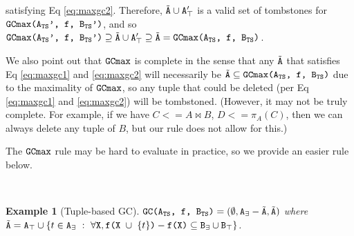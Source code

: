 \documentclass[10pt]{proc}
\numberwithin{equation}{section}
\newtheorem{example}{Example}[section]
\renewcommand{\tt}[1]{\ifmmode\text{\texttt{#1}}\else\texttt{#1}\fi}
\begin{document}
satisfying Eq \eqref{eq:maxgc2}.
Therefore, $\tilde{\tt{A}} \cup \tt{A}_\top'$ is a valid set of tombstones for $\tt{GCmax(A$_\text{TS}$', f, B$_\text{TS}$')}$, and so $\tt{GCmax(A$_\text{TS}$', f, B$_\text{TS}$')} \supseteq \tilde{\tt{A}} \cup \tt{A}_\top' \supseteq \tilde{\tt{A}} = \tt{GCmax(A$_\text{TS}$, f, B$_\text{TS}$)}$.

We also point out that $\tt{GCmax}$ is complete in the sense that any $\tilde{\tt{A}}$ that satisfies Eq \eqref{eq:maxgc1} and \eqref{eq:maxgc2} will necessarily be $\tilde{\tt{A}} \subseteq \tt{GCmax(A$_\text{TS}$, f, B$_\text{TS}$)}$ due to the maximality of $\tt{GCmax}$, so any tuple that could be deleted (per Eq \eqref{eq:maxgc1} and \eqref{eq:maxgc2}) will be tombstoned.
(However, it may not be truly complete. For example, if we have $C <= A \Join B$, $D <= \pi_A(C)$, then we can always delete any tuple of $B$, but our rule does not allow for this.)

The $\tt{GCmax}$ rule may be hard to evaluate in practice, so we provide an easier rule below.

~

\begin{example}[Tuple-based GC]
$\tt{GC(A$_\text{TS}$, f, B$_\text{TS}$)} = (\emptyset, \tt{A}_\exists - \tilde{\tt{A}}, \tilde{\tt{A}})$ where $\tilde{\tt{A}} = \tt{A}_\top \cup \{t \in \tt{A}_\exists ~:~ \forall \tt{X}, \tt{f(X $\cup$ $\{t\}$)} - \tt{f(X)} \subseteq \tt{B}_\exists \cup \tt{B}_\top\}$.
\end{example}
\end{document}
